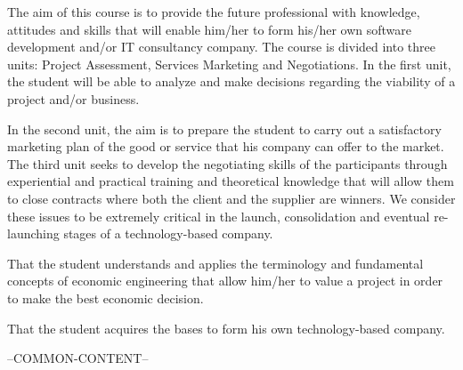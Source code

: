 \begin{syllabus}


\begin{justification}
   The aim of this course is to provide the future professional with knowledge, attitudes and skills that will enable him/her to form his/her own software development and/or IT consultancy company. The course is divided into three units: Project Assessment, Services Marketing and Negotiations. In the first unit, the student will be able to analyze and make decisions regarding the viability of a project and/or business.

   In the second unit, the aim is to prepare the student to carry out a satisfactory marketing plan of the good or service that his company can offer to the market. The third unit seeks to develop the negotiating skills of the participants through experiential and practical training and theoretical knowledge that will allow them to close contracts where both the client and the supplier are winners. We consider these issues to be extremely critical in the launch, consolidation and eventual re-launching stages of a technology-based company.
\end{justification}

\begin{goals}
\item That the student understands and applies the terminology and fundamental concepts of economic engineering that allow him/her to value a project in order to make the best economic decision.
\item That the student acquires the bases to form his own technology-based company.
\end{goals}


--COMMON-CONTENT--


\end{syllabus}
